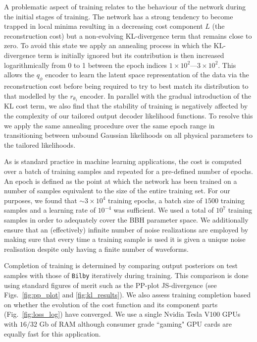 %
%
A problematic aspect of training relates to the behaviour of the network
during the initial stages of training. The network has a strong tendency to
become trapped in local minima resulting in a decreasing cost component $L$
(the reconstruction cost) but a non-evolving \ac{KL}-divergence term that
remains close to zero. To avoid this state we apply an annealing process in
which the \ac{KL}-divergence term is initially ignored but its contribution is
then increased logarithmically from 0 to 1 between the epoch indices
$1\times10^2$---$3\times10^2$. 
 This allows the $q_{\phi}$ encoder to learn the latent space
representation of the data via the reconstruction cost before being required to
try to best match its distribution to that modelled by the $r_{\theta_1}$
encoder. In parallel with the gradual introduction of the \ac{KL} cost term, we
also find that the stability of training is negatively affected by the
complexity of our tailored output decoder likelihood functions. To resolve this
we apply the same annealing procedure over the same epoch range in transitioning
between unbound Gaussian likelihoods on all physical parameters to the tailored
likelihoods.   

%
%
As is standard practice in machine learning applications, the cost is computed
over a batch of training samples and repeated for a pre-defined number of
epochs. An epoch is defined as the point at which the network has been trained 
on a number of samples equivalent to the size of the entire training set. 
For our purposes, we found that $\sim 3 \times 10^4$ training
epochs, a batch size of $1500$ training samples and a learning rate of
$10^{-4}$ was sufficient. We used a total of $10^7$ training samples in order
to adequately cover the \ac{BBH} parameter space. We additionally ensure that
an (effectively) infinite number of noise realizations are employed by making
sure that every time a training sample is used it is given a unique noise
realisation despite only having a finite number of waveforms.

%
%
Completion of training is determined by comparing output posteriors on test
samples with those of \texttt{Bilby} iteratively during training. This
comparison is done using standard figures of merit such as the \ac{PP}-plot
\ac{JS}-divergence (see Figs.~\ref{fig:pp_plot} and
\ref{fig:kl_results}). We also assess training completion based on whether the
evolution of the cost function and its component parts
(Fig.~\ref{fig:loss_log}) have converged. We use a single Nvidia Tesla V100
\acp{GPU} with $16/32$ Gb of RAM although consumer grade ``gaming" \ac{GPU}
cards are equally fast for this application.

